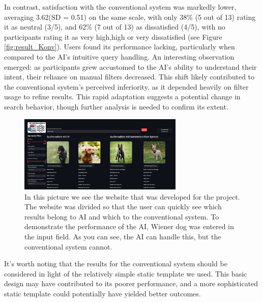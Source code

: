 \documentclass[../../submission.tex]{subfiles}
\begin{document}
In contrast, satisfaction with the conventional 
system was markedly lower, averaging 3.62(SD = 0.51) on the same scale, with only 38\% (5 out of 13) rating it as neutral (3/5), and 62\% 
(7 out of 13) as dissatisfied (4/5), with no participants rating it as very high,high or 
very dissatisfied (see Figure \ref{fig:result_Konv}). Users found its performance lacking, particularly when compared to the AI’s 
intuitive query handling. An interesting observation emerged: as participants grew 
accustomed to the AI’s ability to understand their intent, their reliance on manual 
filters decreased. This shift likely contributed to the conventional system’s perceived 
inferiority, as it depended heavily on filter usage to refine results. This rapid 
adaptation suggests a potential change in search behavior, though further analysis is 
needed to confirm its extent. 
\begin{figure}[h]
    \includegraphics[width=0.7\textwidth]{images/wiener_dog}
    \caption{In this picture we see the website that was developed for the project. The website was divided so that the user can quickly see which results belong to AI and which to the conventional system. To demonstrate the performance of the AI, Wiener dog was entered in the input field. As you can see, the AI can handle this, but the conventional system cannot.}
    \Description{}
    \label{fig:wiener_dog}
 \end{figure}
It’s worth noting that the results for the conventional 
system should be considered in light of the relatively simple static template we used. 
This basic design may have contributed to its poorer performance, and a more sophisticated 
static template could potentially have yielded better outcomes.
\end{document}
